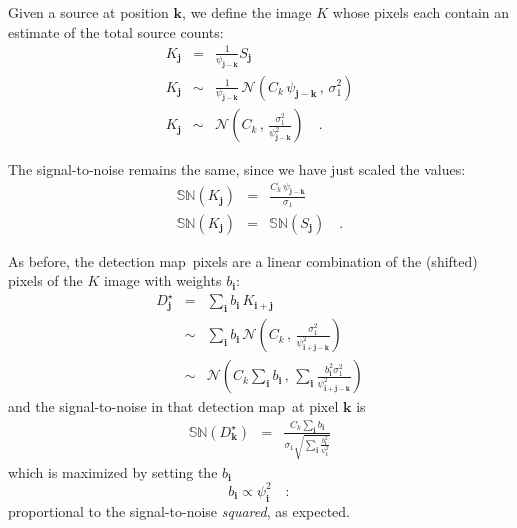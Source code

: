 \documentclass[letterpaper,preprint]{aastex}
\newcommand{\detmap}{detection map}
\newcommand{\drawnfrom}{\sim}
\newcommand{\gaussianN}{\mathcal{N}}
\newcommand{\gaussian}[1]{\gaussianN\!\left(#1\right)}
\newcommand{\psf}{\psi}
\newcommand{\psfat}[1]{\psf_{#1}}
\newcommand{\snr}[1]{\mathbb{SN}(#1)}
\renewcommand{\vec}[1]{\boldsymbol{#1}}
\newcommand{\ivec}{\vec{i}}
\newcommand{\jvec}{\vec{j}}
\newcommand{\kvec}{\vec{k}}
\begin{document}
Given a source at position $\kvec$, we define the image $K$ whose
pixels each contain an estimate of the total source counts:
\begin{eqnarray}
  K_{\jvec} &=& \frac{1}{\psfat{\jvec-\kvec}} S_{\jvec}  \\
  K_{\jvec} &\drawnfrom& \frac{1}{\psfat{\jvec-\kvec}} \, \gaussian{C_k \, \psfat{\jvec-\kvec}\, , \, \sigma_1^2} \\
  K_{\jvec} &\drawnfrom& \gaussian{C_k \, , \, \frac{\sigma_1^2}{\psfat{\jvec-\kvec}^2}} \quad .
\end{eqnarray}

The signal-to-noise remains the same, since we have just scaled the
values:
\begin{eqnarray}
\snr{K_{\jvec}} &=& \frac{C_k \, \psfat{\jvec-\kvec}}{\sigma_1} \\
\snr{K_{\jvec}} &=& \snr{S_{\jvec}} \quad .
\end{eqnarray}


As before, the \detmap\ pixels are a linear combination of the
(shifted) pixels of the $K$ image with weights $b_{\ivec}$:
\begin{eqnarray}
D_{\jvec}^\star &=& \sum_{\ivec} b_{\ivec} \, K_{\ivec+\jvec} \\
&\drawnfrom& \sum_{\ivec} b_{\ivec} \, \gaussian{C_k \,,\, \frac{\sigma_1^2}{\psfat{\ivec+\jvec-\kvec}^2}} \\
&\drawnfrom& \gaussian{C_k \sum_{\ivec} b_{\ivec} \,,\, \sum_{\ivec} \frac{b_{\ivec}^2 \sigma_1^2}{\psfat{\ivec+\jvec-\kvec}^2}}
\end{eqnarray}
and the signal-to-noise in that \detmap\ at pixel $\kvec$ is
\begin{eqnarray}
\snr{D_{\kvec}^\star} &=& \frac{C_k \sum_{\ivec} b_{\ivec}}{\sigma_1 \sqrt{\sum_{\ivec} \frac{b_{\ivec}^2}{\psfat{\ivec}^2}}}
\end{eqnarray}
which is maximized by setting the $b_{\ivec}$
\begin{equation}
b_{\ivec} \propto \psfat{\ivec}^2 \quad :
\end{equation}
proportional to the signal-to-noise \emph{squared}, as expected.

%
%
%
%
\end{document}
